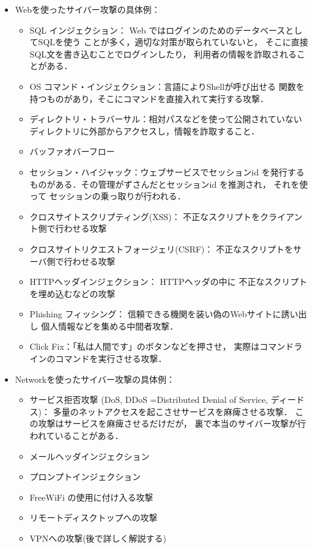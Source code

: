 \begin{itemize}
   \item 
      Webを使ったサイバー攻撃の具体例：
      \begin{itemize}   
         \item    
            SQL インジェクション：
            Web ではログインのためのデータベースとしてSQLを使う
            ことが多く，適切な対策が取られていないと，
            そこに直接SQL文を書き込むことでログインしたり，
            利用者の情報を詐取されることがある．%
         \item    
            OS コマンド・インジェクション：言語によりShellが呼び出せる
            関数を持つものがあり，そこにコマンドを直接入れて実行する攻撃．
         \item    
            ディレクトリ・トラバーサル：相対パスなどを使って公開されていない
            ディレクトリに外部からアクセスし，情報を詐取すること．
         \item
            バッファオバーフロー
         \item    
            セッション・ハイジャック：ウェブサービスでセッションid を発行する
            ものがある．その管理がずさんだとセッションid を推測され，
            それを使って セッションの乗っ取りが行われる．
          \item    
           クロスサイトスクリプティング(XSS)：
           不正なスクリプトをクライアント側で行わせる攻撃
         \item    
            クロスサイトリクエストフォージェリ(CSRF)：
            不正なスクリプトをサーバ側で行わせる攻撃
         \item    
            HTTPヘッダインジェクション：  
            HTTPヘッダの中に 不正なスクリプトを埋め込むなどの攻撃
         \item    
            Phishing フィッシング：
            信頼できる機関を装い偽のWebサイトに誘い出し
            個人情報などを集める中間者攻撃．
         \item    
            Click Fix：「私は人間です」のボタンなどを押させ，
            実際はコマンドラインのコマンドを実行させる攻撃．
      \end{itemize}
      
   \item 
      Networkを使ったサイバー攻撃の具体例：
      \begin{itemize}   
         \item    
            サービス拒否攻撃
            (DoS, DDoS =Distributed Denial of Service, ディードス)：
            多量のネットアクセスを起こさせサービスを麻痺させる攻撃．
            この攻撃はサービスを麻痺させるだけだが，
            裏で本当のサイバー攻撃が行われていることがある．
          \item     
           メールヘッダインジェクション
         \item
            プロンプトインジェクション
         \item    
            FreeWiFi の使用に付け入る攻撃
         \item    
            リモートディスクトップへの攻撃
         \item    
            VPNへの攻撃(後で詳しく解説する)
      \end{itemize}



\end{itemize}

